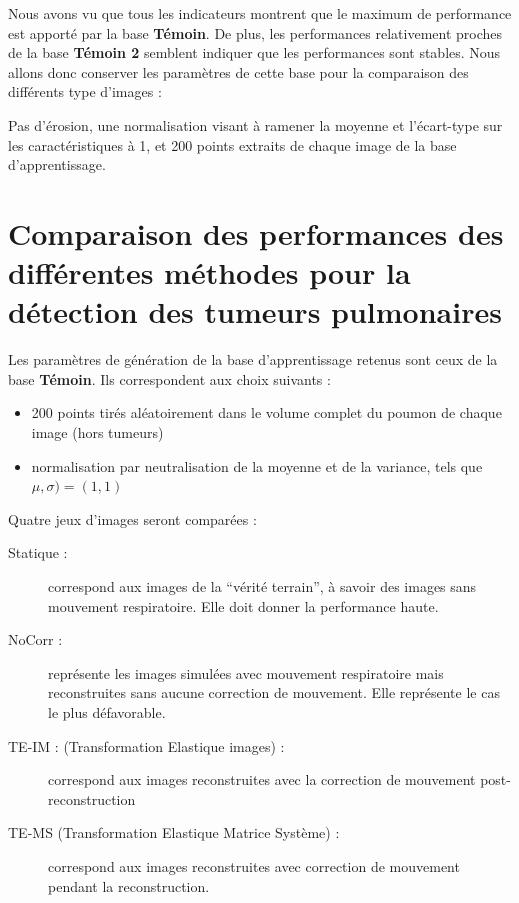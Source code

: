 Nous avons vu que tous les indicateurs montrent que le maximum de performance est apporté par la base \textbf{Témoin}. De plus, les  performances relativement proches de la base \textbf{Témoin 2} semblent indiquer que les performances sont stables. Nous allons donc conserver les paramètres de cette base pour la comparaison des différents type d'images :

Pas d'érosion, une normalisation visant à ramener la moyenne et l'écart-type sur les caractéristiques à 1, et 200 points extraits de chaque image de la base d'apprentissage.
 

\FloatBarrier

\section{Comparaison des performances des différentes méthodes pour la détection des tumeurs pulmonaires}

Les paramètres de génération de la base d'apprentissage retenus sont ceux de la base \textbf{Témoin}. Ils correspondent aux choix suivants :

\begin{itemize}
 \item 200 points tirés aléatoirement dans le volume complet du poumon de chaque image (hors tumeurs)
 \item normalisation par neutralisation de la moyenne et de la variance, tels que $\mu, \sigma) = (1,1)$
\end{itemize}


Quatre jeux d'images seront comparées :

\begin{description}
 \item[Statique :] correspond aux images de la ``vérité terrain'', à savoir des images sans mouvement respiratoire. Elle doit donner la performance haute.  
\item[NoCorr :] représente les images simulées avec mouvement respiratoire mais reconstruites sans aucune correction de mouvement. Elle représente le cas le plus défavorable. 
 \item [TE-IM : (Transformation Elastique images) :] correspond aux images reconstruites avec la correction de mouvement post-reconstruction
 \item [TE-MS (Transformation Elastique Matrice Système) :] correspond aux images reconstruites avec correction de mouvement pendant la reconstruction.
\end{description}


